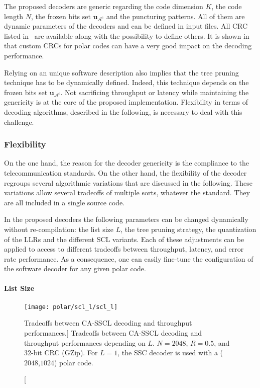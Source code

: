 The proposed decoders are generic regarding the code dimension $K$, the code
length $N$, the frozen bits set $\bm{u}_{\mathcal{A}^c}$ and the puncturing
patterns. All of them are dynamic parameters of the decoders and can be defined
in input files. All CRC listed in~\cite{CRCWiki2017} are available along with
the possibility to define others. It is shown in~\cite{Zhang2017} that custom
CRCs for polar codes can have a very good impact on the decoding performance.

Relying on an unique software description also implies that the tree pruning
technique has to be dynamically defined. Indeed, this technique depends on the
frozen bits set $\bm{u}_{\mathcal{A}^c}$. Not sacrificing throughput or latency
while maintaining the genericity is at the core of the proposed implementation.
Flexibility in terms of decoding algorithms, described in the following, is
necessary to deal with this challenge.

\subsubsection{Flexibility}

On the one hand, the reason for the decoder genericity is the compliance to the
telecommunication standards. On the other hand, the flexibility of the decoder
regroups several algorithmic variations that are discussed in the following.
These variations allow several tradeoffs of multiple sorts, whatever the
standard. They are all included in a single source code.

In the proposed decoders the following parameters can be changed dynamically
without re-compilation: the list size $L$, the tree pruning strategy, the
quantization of the LLRs and the different SCL variants. Each of these
adjustments can be applied to access to different tradeoffs between throughput,
latency, and error rate performance. As a consequence, one can easily fine-tune
the configuration of the software decoder for any given polar code.

\paragraph{List Size}

\begin{figure}[htp]
  \centering
  \texttt{[image: polar/scl\_l/scl\_l]}
  \caption
    [Tradeoffs between CA-SSCL decoding and throughput performances.]
    {Tradeoffs between CA-SSCL decoding and throughput performances depending on
    $L$. $N=2048$, $R=0.5$, and 32-bit CRC (GZip). For $L=1$, the SSC decoder is
    used with a ($2048$,$1024$) polar code.}
  \label{plot:polar_scl_l}
\end{figure}

